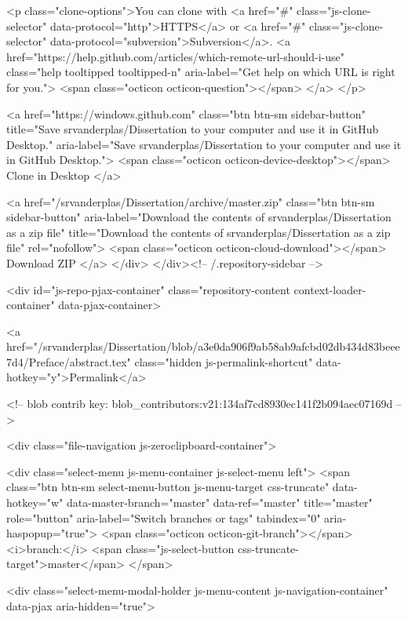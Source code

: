 <p class="clone-options">You can clone with
  <a href="#" class="js-clone-selector" data-protocol="http">HTTPS</a> or <a href="#" class="js-clone-selector" data-protocol="subversion">Subversion</a>.
  <a href="https://help.github.com/articles/which-remote-url-should-i-use" class="help tooltipped tooltipped-n" aria-label="Get help on which URL is right for you.">
    <span class="octicon octicon-question"></span>
  </a>
</p>


  <a href="https://windows.github.com" class="btn btn-sm sidebar-button" title="Save srvanderplas/Dissertation to your computer and use it in GitHub Desktop." aria-label="Save srvanderplas/Dissertation to your computer and use it in GitHub Desktop.">
    <span class="octicon octicon-device-desktop"></span>
    Clone in Desktop
  </a>


                <a href="/srvanderplas/Dissertation/archive/master.zip"
                   class="btn btn-sm sidebar-button"
                   aria-label="Download the contents of srvanderplas/Dissertation as a zip file"
                   title="Download the contents of srvanderplas/Dissertation as a zip file"
                   rel="nofollow">
                  <span class="octicon octicon-cloud-download"></span>
                  Download ZIP
                </a>
              </div>
        </div><!-- /.repository-sidebar -->

        <div id="js-repo-pjax-container" class="repository-content context-loader-container" data-pjax-container>

          

<a href="/srvanderplas/Dissertation/blob/a3e0da906f9ab58ab9afcbd02db434d83beee7d4/Preface/abstract.tex" class="hidden js-permalink-shortcut" data-hotkey="y">Permalink</a>

<!-- blob contrib key: blob_contributors:v21:134af7cd8930ec141f2b094aec07169d -->

<div class="file-navigation js-zeroclipboard-container">
  
<div class="select-menu js-menu-container js-select-menu left">
  <span class="btn btn-sm select-menu-button js-menu-target css-truncate" data-hotkey="w"
    data-master-branch="master"
    data-ref="master"
    title="master"
    role="button" aria-label="Switch branches or tags" tabindex="0" aria-haspopup="true">
    <span class="octicon octicon-git-branch"></span>
    <i>branch:</i>
    <span class="js-select-button css-truncate-target">master</span>
  </span>

  <div class="select-menu-modal-holder js-menu-content js-navigation-container" data-pjax aria-hidden="true">

